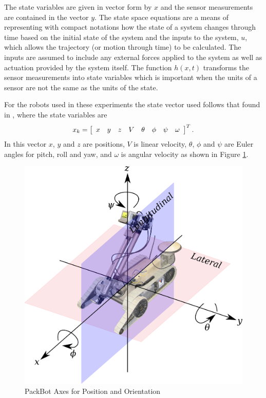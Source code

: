 The state variables are given in vector form by $x$ and the sensor measurements are contained in the vector $y$. The state space equations are a means of representing with compact notations how the state of a system changes through time based on the initial state of the system and the inputs to the system, $u$, which allows the trajectory (or motion through time) to be calculated. The inputs are assumed to include any external forces applied to the system as well as actuation provided by the system itself. The function $h(x,t)$ transforms the sensor measurements into state variables which is important when the units of a sensor are not the same as the units of the state.

For the robots used in these experiments the state vector used follows that found in \cite{Kelly_1994_338}, \cite{Kelly_1994_333} where the state variables are
\begin{align*}
x_k = \left[\begin{array}{c c c c c c c c} x & y & z & V & \theta & \phi & \psi & \omega \end{array}\right]^T.
\end{align*}
In this vector $x$, $y$ and $z$ are positions, $V$ is linear velocity, $\theta$, $\phi$ and $\psi$ are Euler angles for pitch, roll and yaw, and $\omega$ is angular velocity as shown in Figure \ref{fig:packbotaxes}.

\begin{figure}[ht!]
    \centering
    \includegraphics[width=.8\textwidth]{images/packbotaxes}
    \caption{PackBot Axes for Position and Orientation}
    \label{fig:packbotaxes}
\end{figure}

